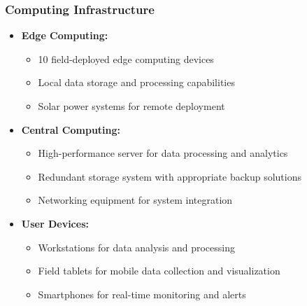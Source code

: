 \subsubsection{Computing Infrastructure}
\begin{itemize}
    \item \textbf{Edge Computing:}
    \begin{itemize}
        \item 10 field-deployed edge computing devices
        \item Local data storage and processing capabilities
        \item Solar power systems for remote deployment
    \end{itemize}
    
    \item \textbf{Central Computing:}
    \begin{itemize}
        \item High-performance server for data processing and analytics
        \item Redundant storage system with appropriate backup solutions
        \item Networking equipment for system integration
    \end{itemize}
    
    \item \textbf{User Devices:}
    \begin{itemize}
        \item Workstations for data analysis and processing
        \item Field tablets for mobile data collection and visualization
        \item Smartphones for real-time monitoring and alerts
    \end{itemize}
\end{itemize}

